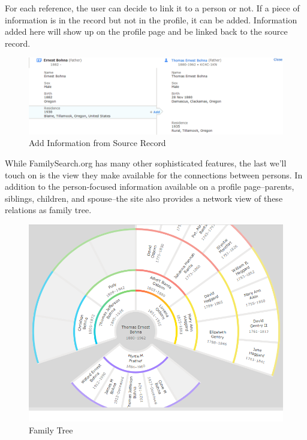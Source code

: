 \documentclass[format=siggraph, review=true]{acmart}
\begin{document}
For each reference, the user can decide to link it to a person or not. If a
piece of information is in the record but not in the profile, it can
be added. Information added here will show up on the profile page and
be linked back to the source record.

\begin{figure}[h]
\includegraphics[width=\columnwidth]{images/familysearch/add_info.png}
\caption{Add Information from Source Record}
\label{fig:source-linker}
\end{figure}

While FamilySearch.org has many other sophisticated features, the last
we'll touch on is the view they make available for the connections
between persons. In addition to the person-focused information available
on a profile page--parents, siblings, children, and
spouse--the site also provides a network view of these relations as
family tree.

\begin{figure}[h]
\includegraphics[width=\columnwidth]{images/familysearch/family_tree.png}
\caption{Family Tree}
\label{fig:source-linker}
\end{figure}
\end{document}
